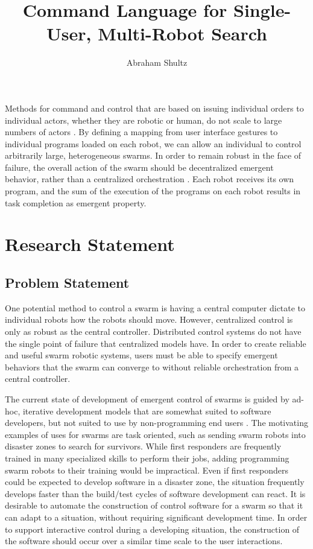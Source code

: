 \documentclass[]{article}
\title{Command Language for Single-User, Multi-Robot Search}
\author{Abraham Shultz}
\begin{document}
\maketitle

\begin{abstract}

\end{abstract}

Methods for command and control that are based on issuing individual orders to individual actors, whether they are robotic or human, do not scale to large numbers of actors . 
By defining a mapping from user interface gestures to individual programs loaded on each robot, we can allow an individual to control arbitrarily large, heterogeneous swarms.
In order to remain robust in the face of failure, the overall action of the swarm should be decentralized emergent behavior, rather than a centralized orchestration . 
Each robot receives its own program, and the sum of the execution of the programs on each robot results in task completion as emergent property.

\section{Research Statement}

\subsection{Problem Statement}

One potential method to control a swarm is having a central computer dictate to individual robots how the robots should move.
However, centralized control is only as robust as the central controller. 
Distributed control systems do not have the single point of failure that centralized models have. 
In order to create reliable and useful swarm robotic systems, users must be able to specify emergent behaviors that the swarm can converge to without reliable orchestration from a central controller. 

The current state of development of emergent control of swarms is guided by ad-hoc, iterative development models that are somewhat suited to software developers, but not suited to use by non-programming end users \cite{palmer2005behavioral}.
The motivating examples of uses for swarms are task oriented, such as sending swarm robots into disaster zones to search for survivors. 
While first responders are frequently trained in many specialized skills to perform their jobs, adding programming swarm robots to their training would be impractical. 
Even if first responders could be expected to develop software in a disaster zone, the situation frequently develops faster than the build/test cycles of software development can react. 
It is desirable to automate the construction of control software for a swarm so that it can adapt to a situation, without requiring significant development time. 
In order to support interactive control during a developing situation, the construction of the software should occur over a similar time scale to the user interactions. 
\end{document}
